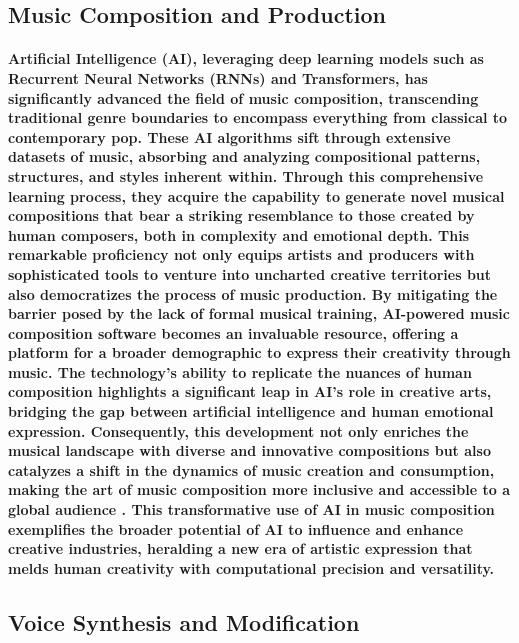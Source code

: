 \documentclass[11pt,a4paper,oneside]{report}
\begin{document}
\subsection{Music Composition and Production}
\paragraph{Artificial Intelligence (AI), leveraging deep learning models such as Recurrent Neural Networks (RNNs) and Transformers, has significantly advanced the field of music composition, transcending traditional genre boundaries to encompass everything from classical to contemporary pop. These AI algorithms sift through extensive datasets of music, absorbing and analyzing compositional patterns, structures, and styles inherent within. Through this comprehensive learning process, they acquire the capability to generate novel musical compositions that bear a striking resemblance to those created by human composers, both in complexity and emotional depth. This remarkable proficiency not only equips artists and producers with sophisticated tools to venture into uncharted creative territories but also democratizes the process of music production. By mitigating the barrier posed by the lack of formal musical training, AI-powered music composition software becomes an invaluable resource, offering a platform for a broader demographic to express their creativity through music. The technology's ability to replicate the nuances of human composition highlights a significant leap in AI's role in creative arts, bridging the gap between artificial intelligence and human emotional expression. Consequently, this development not only enriches the musical landscape with diverse and innovative compositions but also catalyzes a shift in the dynamics of music creation and consumption, making the art of music composition more inclusive and accessible to a global audience \cite{briot2021artificial}. This transformative use of AI in music composition exemplifies the broader potential of AI to influence and enhance creative industries, heralding a new era of artistic expression that melds human creativity with computational precision and versatility.}

\subsection{Voice Synthesis and Modification}
\end{document}
